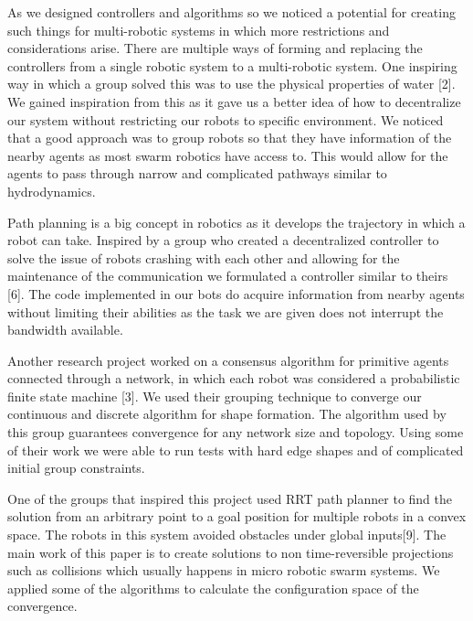 As we designed controllers and algorithms so we noticed a potential for creating such things for multi-robotic systems in which more restrictions and considerations arise. There are multiple ways of forming and replacing the controllers from a single robotic system to a multi-robotic system. One inspiring way in which a group solved this was to use the physical properties of water [2]. We gained inspiration from this as it gave us a better idea of how to decentralize our system without restricting our robots to specific environment. We noticed that a good approach was to group robots so that they have information of the nearby agents as most swarm robotics have access to. This would allow for the agents to pass through narrow and complicated pathways similar to hydrodynamics. 

Path planning is a big concept in robotics as it develops the trajectory in which a robot can take. Inspired by a group who created a decentralized controller to solve the issue of robots crashing with each other and allowing for the maintenance of the communication we formulated a controller similar to theirs [6]. The code implemented in our bots do acquire information from nearby agents without limiting their abilities as the task we are given does not interrupt the bandwidth available.

 Another research project worked on a consensus algorithm for primitive agents connected through a network, in which each robot was considered a probabilistic finite state machine [3]. We used their grouping technique to converge our continuous and discrete algorithm for shape formation. The algorithm used by this group guarantees convergence for any network size and topology. Using some of their work we were able to run tests with hard edge shapes and of complicated initial group constraints. 
 
 One of the groups that inspired this project used RRT path planner to find the solution from an arbitrary point to a goal position for multiple robots in a convex space. The robots in this system avoided obstacles under global inputs[9]. The main work of this paper is to create solutions to non time-reversible projections such as collisions which usually happens in micro robotic swarm systems. We applied some of the algorithms to calculate the configuration space of the convergence.    
 
 


\addtolength{\textheight}{-3cm}   %

